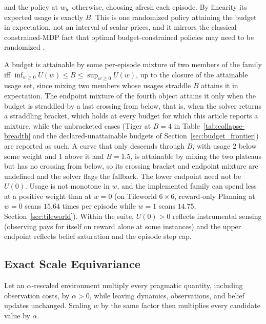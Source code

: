 \begin{definition}
and the policy at $w_{\mathrm{lo}}$ otherwise, choosing afresh each episode. By linearity its expected usage is exactly $B$. This is one randomized policy attaining the budget in expectation, not an interval of scalar prices, and it mirrors the classical constrained-MDP fact that optimal budget-constrained policies may need to be randomized \citep{altman1999,kim2011cpomdp}.

A budget is attainable by some per-episode mixture of two members of the family iff $\inf_{w \ge 0} U(w) \le B \le \sup_{w \ge 0} U(w)$, up to the closure of the attainable usage set, since mixing two members whose usages straddle $B$ attains it in expectation. The endpoint mixture of the fourth object attains it only when the budget is straddled by a last crossing from below, that is, when the solver returns a straddling bracket, which holds at every budget for which this article reports a mixture, while the unbracketed cases (Tiger at $B{=}4$ in Table~\ref{tab:collapse-breadth} and the declared-unattainable budgets of Section~\ref{sec:budget_frontier}) are reported as such. A curve that only descends through $B$, with usage $2$ below some weight and $1$ above it and $B{=}1.5$, is attainable by mixing the two plateaus but has no crossing from below, so its crossing bracket and endpoint mixture are undefined and the solver flags the fallback. The lower endpoint need not be $U(0)$. Usage is not monotone in $w$, and the implemented family can spend less at a positive weight than at $w{=}0$ (on Tileworld $6{\times}6$, reward-only Planning at $w{=}0$ scans $15.64$ times per episode while $w{=}1$ scans $14.75$, Section~\ref{sec:tileworld}). Within the suite, $U(0)>0$ reflects instrumental sensing (observing pays for itself on reward alone at some instances) and the upper endpoint reflects belief saturation and the episode step cap.
\end{definition}

\subsection{Exact Scale Equivariance}
\label{sec:pi1}

Let an $\alpha$-rescaled environment multiply every pragmatic quantity, including observation costs, by $\alpha>0$, while leaving dynamics, observations, and belief updates unchanged. Scaling $w$ by the same factor then multiplies every candidate value by $\alpha$.

